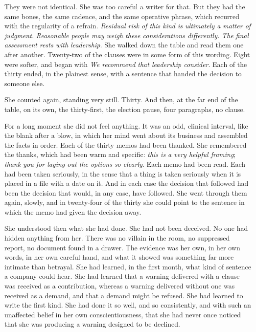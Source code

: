 They were not identical. She was too careful a writer for that. But they had the same bones, the same cadence, and the same operative phrase, which recurred with the regularity of a refrain. \emph{Residual risk of this kind is ultimately a matter of judgment.} \emph{Reasonable people may weigh these considerations differently.} \emph{The final assessment rests with leadership.} She walked down the table and read them one after another. Twenty-two of the clauses were in some form of this wording. Eight were softer, and began with \emph{We recommend that leadership consider}. Each of the thirty ended, in the plainest sense, with a sentence that handed the decision to someone else.

She counted again, standing very still. Thirty. And then, at the far end of the table, on its own, the thirty-first, the election pause, four paragraphs, no clause.

For a long moment she did not feel anything. It was an odd, clinical interval, like the blank after a blow, in which her mind went about its business and assembled the facts in order. Each of the thirty memos had been thanked. She remembered the thanks, which had been warm and specific: \emph{this is a very helpful framing}; \emph{thank you for laying out the options so clearly}. Each memo had been read. Each had been taken seriously, in the sense that a thing is taken seriously when it is placed in a file with a date on it. And in each case the decision that followed had been the decision that would, in any case, have followed. She went through them again, slowly, and in twenty-four of the thirty she could point to the sentence in which the memo had given the decision away.

She understood then what she had done. She had not been deceived. No one had hidden anything from her. There was no villain in the room, no suppressed report, no document found in a drawer. The evidence was her own, in her own words, in her own careful hand, and what it showed was something far more intimate than betrayal. She had learned, in the first month, what kind of sentence a company could hear. She had learned that a warning delivered with a clause was received as a contribution, whereas a warning delivered without one was received as a demand, and that a demand might be refused. She had learned to write the first kind. She had done it so well, and so consistently, and with such an unaffected belief in her own conscientiousness, that she had never once noticed that she was producing a warning designed to be declined.

